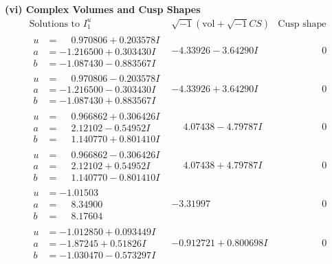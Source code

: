 \documentclass[1p]{elsarticle_modified}
\theoremstyle{definition}
\newcommand{\I}{\sqrt{-1}}
\begin{document}
\newpage\flushleft \textbf{(vi) Complex Volumes and Cusp Shapes}
$$\begin{array}{c|c|c}  
\text{Solutions to }I^u_{1}& \I (\text{vol} + \sqrt{-1}CS) & \text{Cusp shape}\\
 \hline 
\begin{aligned}
u &= \phantom{-}0.970806 + 0.203578 I \\
a &= -1.216500 + 0.303430 I \\
b &= -1.087430 - 0.883567 I\end{aligned}
 & -4.33926 - 3.64290 I & \phantom{-0.000000 } 0 \\ \hline\begin{aligned}
u &= \phantom{-}0.970806 - 0.203578 I \\
a &= -1.216500 - 0.303430 I \\
b &= -1.087430 + 0.883567 I\end{aligned}
 & -4.33926 + 3.64290 I & \phantom{-0.000000 } 0 \\ \hline\begin{aligned}
u &= \phantom{-}0.966862 + 0.306426 I \\
a &= \phantom{-}2.12102 - 0.54952 I \\
b &= \phantom{-}1.140770 + 0.801410 I\end{aligned}
 & \phantom{-}4.07438 - 4.79787 I & \phantom{-0.000000 } 0 \\ \hline\begin{aligned}
u &= \phantom{-}0.966862 - 0.306426 I \\
a &= \phantom{-}2.12102 + 0.54952 I \\
b &= \phantom{-}1.140770 - 0.801410 I\end{aligned}
 & \phantom{-}4.07438 + 4.79787 I & \phantom{-0.000000 } 0 \\ \hline\begin{aligned}
u &= -1.01503\phantom{ +0.000000I} \\
a &= \phantom{-}8.34900\phantom{ +0.000000I} \\
b &= \phantom{-}8.17604\phantom{ +0.000000I}\end{aligned}
 & -3.31997\phantom{ +0.000000I} & \phantom{-0.000000 } 0 \\ \hline\begin{aligned}
u &= -1.012850 + 0.093449 I \\
a &= -1.87245 + 0.51826 I \\
b &= -1.030470 - 0.573297 I\end{aligned}
 & -0.912721 + 0.800698 I & \phantom{-0.000000 } 0 \\ \hline\begin{aligned}

\end{aligned}
\end{array}$$
\end{document}
